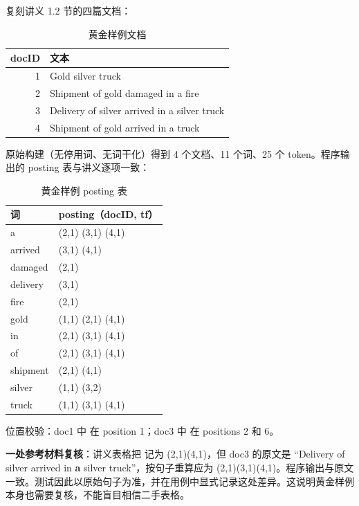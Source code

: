  复刻讲义 1.2 节的四篇文档：

\begin{table}[H]
  \centering
  \caption{黄金样例文档}
  \label{tab:golden-docs}
  \begin{tabularx}{\linewidth}{@{}r X@{}}
    \toprule
    docID & 文本 \\
    \midrule
    1 & Gold silver truck \\
    2 & Shipment of gold damaged in a fire \\
    3 & Delivery of silver arrived in a silver truck \\
    4 & Shipment of gold arrived in a truck \\
    \bottomrule
  \end{tabularx}
\end{table}

原始构建（无停用词、无词干化）得到 4 个文档、11 个词、25 个 token。程序输出的 posting 表与讲义逐项一致：

\begin{table}[H]
  \centering
  \caption{黄金样例 posting 表}
  \label{tab:golden-postings}
  \begin{tabularx}{0.72\linewidth}{@{}l X@{}}
    \toprule
    词 & posting（docID, tf） \\
    \midrule
    a & (2,1) (3,1) (4,1) \\
    arrived & (3,1) (4,1) \\
    damaged & (2,1) \\
    delivery & (3,1) \\
    fire & (2,1) \\
    gold & (1,1) (2,1) (4,1) \\
    in & (2,1) (3,1) (4,1) \\
    of & (2,1) (3,1) (4,1) \\
    shipment & (2,1) (4,1) \\
    silver & (1,1) (3,2) \\
    truck & (1,1) (3,1) (4,1) \\
    \bottomrule
  \end{tabularx}
\end{table}

位置校验：doc1 中  在 position 1；doc3 中  在 positions 2 和 6。

\textbf{一处参考材料复核}：讲义表格把  记为 (2,1)(4,1)，但 doc3 的原文是 “Delivery of silver arrived in \textbf{a} silver truck”，按句子重算应为 (2,1)(3,1)(4,1)。程序输出与原文一致。测试因此以原始句子为准，并在用例中显式记录这处差异。这说明黄金样例本身也需要复核，不能盲目相信二手表格。

